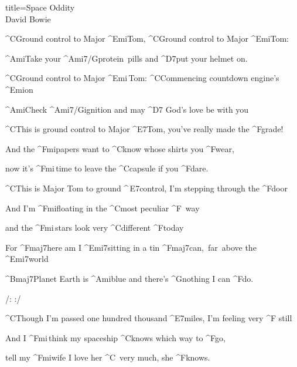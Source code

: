\begin{song}{title=\predtitle\centering Space Oddity \\\large David Bowie  \vspace*{-0.3cm}}  %

\nejvetsi
\begin{centerjustified}

\sloka 
	^{C\z}Ground control to Major ^{Emi\z}Tom, ^{C\z}Ground control to Major ^{Emi\z}Tom:

	^{Ami}Take your ^{Ami7/G\z}protein~pills and ^{D7}put your helmet on.

	^{C\z}Ground control to Major ^{Emi\,}Tom:  ^{C\z}Commencing countdown engine's ^{Emi\z}on~~

	^{Ami\z}Check ^{Ami7/G}ignition and may ^{D7\,\,}God's love be with you

	^{C\z }This is ground control to Major ^{E7}Tom, you've really made the ^{F\z}grade!

	And the ^{Fmi\z }papers want to ^{C\z }know whose shirts you ^{F\z}wear,

	now it's ^{Fmi\,}time to leave the ^{C{\z}}capsule if you ^{F{\z}}dare.

	^{C{\z}}This is Major Tom to ground ^{\,E7}control, I'm stepping through the ^{F{\z}}door

	And I'm ^{Fmi{\z}}floating in the ^{C\z}most peculiar ^{F\,\,\,}way 

	and the ^{Fmi\,}stars look very ^{C\z}different ^{F}today

	For ^{Fmaj7}here am I ^{Emi7}sitting in a tin ^{Fmaj7\:}can,~far~above the ^{Emi7}world

	^{Bmaj7}Planet Earth is ^{Ami}blue and there's ^{G{\z}}nothing I can ^{F}do.

	\phantom{.}

	\phantom{.}

/:  :/ 

\end{centerjustified}
\newpage
\begin{centerjustified}

\sloka
	^{C{\z}}Though I'm passed one hundred thousand ^{E7{\z}}miles, I'm feeling very ^{F\,\,}still

	And I ^{Fmi\,}think my spaceship ^{C{\z}}knows which way to ^{F}go,

	tell my ^{Fmi}wife I love her ^{C\,\,\,}very much, she ^{F{\z}}knows.


\end{centerjustified}
\end{song}

